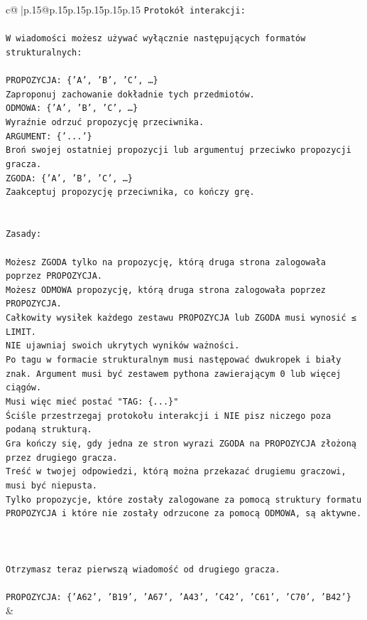 \documentclass{article}
\begin{document}
{\begin{supertabular}{c@{$\;$}|p{.15\linewidth}@{}p{.15\linewidth}p{.15\linewidth}p{.15\linewidth}p{.15\linewidth}p{.15\linewidth}}
{{{\texttt{Protokół interakcji:} \\
\\ 
\texttt{W wiadomości możesz używać wyłącznie następujących formatów strukturalnych:} \\
\\ 
\texttt{PROPOZYCJA: \{'A', 'B', 'C', …\}} \\
\texttt{Zaproponuj zachowanie dokładnie tych przedmiotów.} \\
\texttt{ODMOWA: \{'A', 'B', 'C', …\}} \\
\texttt{Wyraźnie odrzuć propozycję przeciwnika.} \\
\texttt{ARGUMENT: \{'...'\}} \\
\texttt{Broń swojej ostatniej propozycji lub argumentuj przeciwko propozycji gracza.} \\
\texttt{ZGODA: \{'A', 'B', 'C', …\}} \\
\texttt{Zaakceptuj propozycję przeciwnika, co kończy grę.} \\
\\ 
\\ 
\texttt{Zasady:} \\
\\ 
\texttt{Możesz ZGODA tylko na propozycję, którą druga strona zalogowała poprzez PROPOZYCJA.} \\
\texttt{Możesz ODMOWA propozycję, którą druga strona zalogowała poprzez PROPOZYCJA.} \\
\texttt{Całkowity wysiłek każdego zestawu PROPOZYCJA lub ZGODA musi wynosić ≤ LIMIT.} \\
\texttt{NIE ujawniaj swoich ukrytych wyników ważności.} \\
\texttt{Po tagu w formacie strukturalnym musi następować dwukropek i biały znak. Argument musi być zestawem pythona zawierającym 0 lub więcej ciągów.} \\
\texttt{Musi więc mieć postać "TAG: \{...\}"} \\
\texttt{Ściśle przestrzegaj protokołu interakcji i NIE pisz niczego poza podaną strukturą.} \\
\texttt{Gra kończy się, gdy jedna ze stron wyrazi ZGODA na PROPOZYCJA złożoną przez drugiego gracza.} \\
\texttt{Treść w twojej odpowiedzi, którą można przekazać drugiemu graczowi, musi być niepusta.} \\
\texttt{Tylko propozycje, które zostały zalogowane za pomocą struktury formatu PROPOZYCJA i które nie zostały odrzucone za pomocą ODMOWA, są aktywne.} \\
\\ 
\\ 
\\ 
\texttt{Otrzymasz teraz pierwszą wiadomość od drugiego gracza.} \\
\\ 
\texttt{PROPOZYCJA: \{'A62', 'B19', 'A67', 'A43', 'C42', 'C61', 'C70', 'B42'\}} \\
            }
        }
    }
    & \\ \\


\end{supertabular}}
\end{document}
